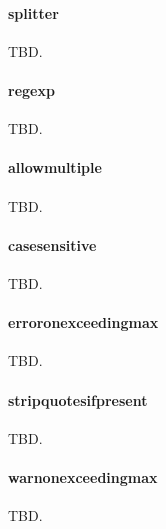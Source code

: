 \documentclass[a4paper]{article}
\begin{document}
\label{prop:splitter}
\paragraph{splitter} TBD.

\label{prop:regexp}
\paragraph{regexp} TBD.

\label{prop:allowmultiple}
\paragraph{allowmultiple} TBD.

\label{prop:casesensitive}
\paragraph{casesensitive} TBD.

\label{prop:erroronexceedingmax}
\paragraph{erroronexceedingmax} TBD.

\label{prop:stripquotesifpresent}
\paragraph{stripquotesifpresent} TBD.

\label{prop:warnonexceedingmax}
\paragraph{warnonexceedingmax} TBD.
\end{document}

